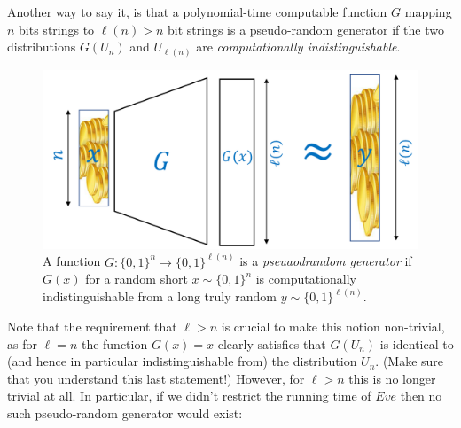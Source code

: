Another way to say it, is that a polynomial-time computable function
\(G\) mapping \(n\) bits strings to \(\ell(n)>n\) bit strings is a
pseudo-random generator if the two distributions \(G(U_n)\) and
\(U_{\ell(n)}\) are \emph{computationally indistinguishable}.


\begin{figure}
\centering
\includegraphics[width=\textwidth, height=0.25\paperheight, keepaspectratio]{../figure/prg_def.png}
\caption{A function \(G:\{0,1\}^n \rightarrow \{0,1\}^{\ell(n)}\) is a
\emph{pseuaodrandom generator} if \(G(x)\) for a random short
\(x \sim \{0,1\}^n\) is computationally indistinguishable from a long
truly random \(y \sim \{0,1\}^{\ell(n)}\).}
\label{prgdeffig}
\end{figure}

Note that the requirement that \(\ell>n\) is crucial to make this notion
non-trivial, as for \(\ell=n\) the function \(G(x)=x\) clearly satisfies
that \(G(U_n)\) is identical to (and hence in particular
indistinguishable from) the distribution \(U_n\). (Make sure that you
understand this last statement!) However, for \(\ell>n\) this is no
longer trivial at all. In particular, if we didn't restrict the running
time of \(Eve\) then no such pseudo-random generator would exist:

